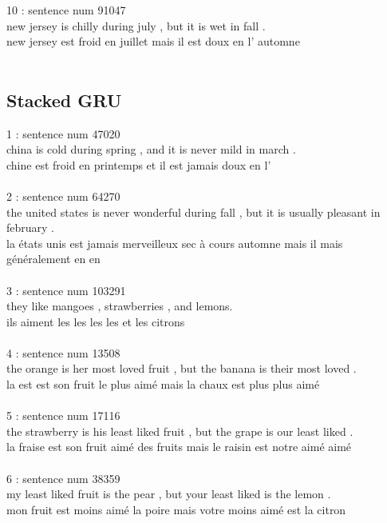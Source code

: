 \documentclass[12pt,oneside,geqno]{article}
\begin{document}
	10 : sentence num 91047\\
	new jersey is chilly during july , but it is wet in fall .\\
	new jersey est froid en juillet mais il est doux en l' automne \\\\
	
	\subsection{Stacked GRU}
	1 : sentence num 47020\\
	china is cold during spring , and it is never mild in march .\\
	chine est froid en printemps et il est jamais doux en l' \\\\
	
	2 : sentence num 64270\\
	the united states is never wonderful during fall , but it is usually pleasant in february .\\
	la états unis est jamais merveilleux sec à cours automne mais il mais généralement en en \\\\
	
	3 : sentence num 103291\\
	they like mangoes , strawberries , and lemons.\\
	ils aiment les les les les et les citrons \\\\
	
	4 : sentence num 13508\\
	the orange is her most loved fruit , but the banana is their most loved .\\
	la est est son fruit le plus aimé mais la chaux est plus plus aimé \\\\
	
	5 : sentence num 17116\\
	the strawberry is his least liked fruit , but the grape is our least liked .\\
	la fraise est son fruit aimé des fruits mais le raisin est notre aimé aimé \\\\
	
	6 : sentence num 38359\\
	my least liked fruit is the pear , but your least liked is the lemon .\\
	mon fruit est moins aimé la poire mais votre moins aimé est la citron \\\\
	
\end{document}
